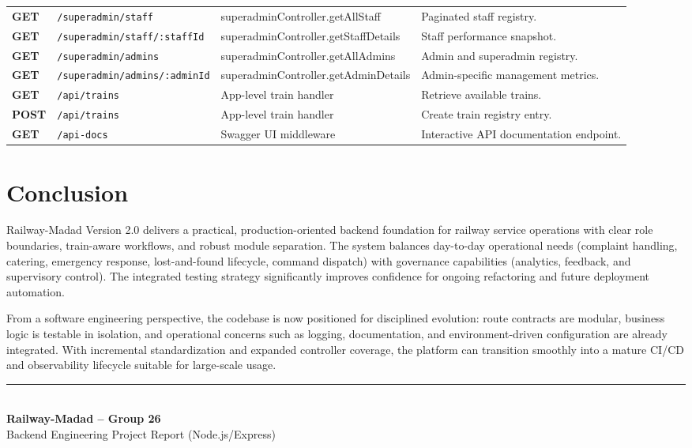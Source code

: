 \documentclass[12pt,a4paper]{report}
\begin{document}
\begin{longtable}{>{\bfseries}p{} p{} p{} p{}}
GET & \texttt{/superadmin/staff} & superadminController.getAllStaff & Paginated staff registry. \\
GET & \texttt{/superadmin/staff/:staffId} & superadminController.getStaffDetails & Staff performance snapshot. \\
GET & \texttt{/superadmin/admins} & superadminController.getAllAdmins & Admin and superadmin registry. \\
GET & \texttt{/superadmin/admins/:adminId} & superadminController.getAdminDetails & Admin-specific management metrics. \\
GET & \texttt{/api/trains} & App-level train handler & Retrieve available trains. \\
POST & \texttt{/api/trains} & App-level train handler & Create train registry entry. \\
GET & \texttt{/api-docs} & Swagger UI middleware & Interactive API documentation endpoint. \\
\bottomrule
\end{longtable}

\chapter{Conclusion}

Railway-Madad Version 2.0 delivers a practical, production-oriented backend foundation for railway service operations with clear role boundaries, train-aware workflows, and robust module separation. The system balances day-to-day operational needs (complaint handling, catering, emergency response, lost-and-found lifecycle, command dispatch) with governance capabilities (analytics, feedback, and supervisory control). The integrated testing strategy significantly improves confidence for ongoing refactoring and future deployment automation.

From a software engineering perspective, the codebase is now positioned for disciplined evolution: route contracts are modular, business logic is testable in isolation, and operational concerns such as logging, documentation, and environment-driven configuration are already integrated. With incremental standardization and expanded controller coverage, the platform can transition smoothly into a mature CI/CD and observability lifecycle suitable for large-scale usage.

\vfill
\begin{center}
\textcolor{Primary}{\rule{0.7\textwidth}{0.8pt}}\\[0.4em]
\textbf{Railway-Madad -- Group 26}\\
\small Backend Engineering Project Report (Node.js/Express)
\end{center}
\end{document}
